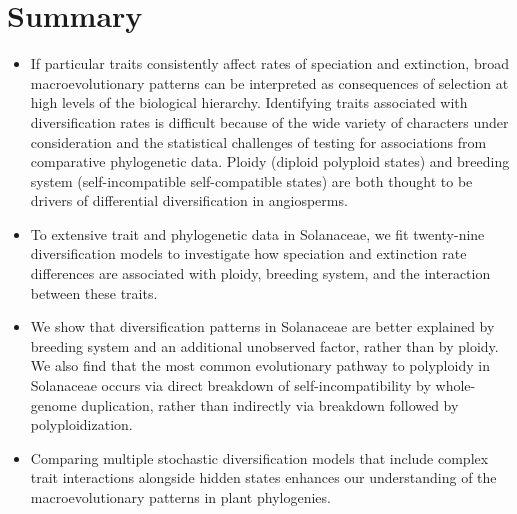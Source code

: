 \section{Summary}

\begin{itemize}

\item If particular traits consistently affect rates of speciation and extinction, broad macroevolutionary patterns can be interpreted as consequences of selection at high levels of the biological hierarchy.
Identifying traits associated with diversification rates is difficult because of the wide variety of characters under consideration and the statistical challenges of testing for associations from comparative phylogenetic data.
Ploidy (diploid \vs polyploid states) and breeding system (self-incompatible \vs self-compatible states) are both thought to be drivers of differential diversification in angiosperms.

\item To extensive trait and phylogenetic data in Solanaceae, we fit twenty-nine diversification models to investigate how speciation and extinction rate differences are associated with ploidy, breeding system, and the interaction between these traits.

\item We show that diversification patterns in Solanaceae are better explained by breeding system and an additional unobserved factor, rather than by ploidy.  %
We also find that the most common evolutionary pathway to polyploidy in Solanaceae occurs via direct breakdown of self-incompatibility by whole-genome duplication, rather than indirectly via breakdown followed by polyploidization.

\item Comparing multiple stochastic diversification models that include complex trait interactions alongside hidden states enhances our understanding of the macroevolutionary patterns in plant phylogenies.  %

\end{itemize}

